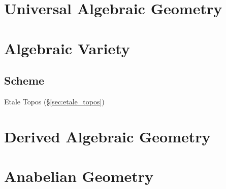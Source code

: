 \section{Universal Algebraic Geometry}\label{sec:universal_geometry}



\section{Algebraic Variety}\label{sec:algebraic_variety}

\subsection{Scheme}\label{sec:scheme}

Etale Topos (\S\ref{sec:etale_topos})



\section{Derived Algebraic Geometry}
\label{sec:derived_algebraic_geometry}

\section{Anabelian Geometry}\label{sec:anabelian_geometry}
